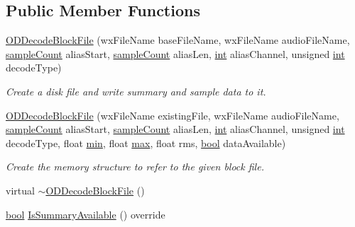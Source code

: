 \subsection*{Public Member Functions}
\begin{DoxyCompactItemize}
\item 
\hyperlink{class_o_d_decode_block_file_a4fceaa09f31eba3324c9d2920ae94917}{O\+D\+Decode\+Block\+File} (wx\+File\+Name base\+File\+Name, wx\+File\+Name audio\+File\+Name, \hyperlink{include_2audacity_2_types_8h_afa427e1f521ea5ec12d054e8bd4d0f71}{sample\+Count} alias\+Start, \hyperlink{include_2audacity_2_types_8h_afa427e1f521ea5ec12d054e8bd4d0f71}{sample\+Count} alias\+Len, \hyperlink{xmltok_8h_a5a0d4a5641ce434f1d23533f2b2e6653}{int} alias\+Channel, unsigned \hyperlink{xmltok_8h_a5a0d4a5641ce434f1d23533f2b2e6653}{int} decode\+Type)
\begin{DoxyCompactList}\small\item\em Create a disk file and write summary and sample data to it. \end{DoxyCompactList}\item 
\hyperlink{class_o_d_decode_block_file_a9004e38acde9c80cb2f01de0ca780e76}{O\+D\+Decode\+Block\+File} (wx\+File\+Name existing\+File, wx\+File\+Name audio\+File\+Name, \hyperlink{include_2audacity_2_types_8h_afa427e1f521ea5ec12d054e8bd4d0f71}{sample\+Count} alias\+Start, \hyperlink{include_2audacity_2_types_8h_afa427e1f521ea5ec12d054e8bd4d0f71}{sample\+Count} alias\+Len, \hyperlink{xmltok_8h_a5a0d4a5641ce434f1d23533f2b2e6653}{int} alias\+Channel, unsigned \hyperlink{xmltok_8h_a5a0d4a5641ce434f1d23533f2b2e6653}{int} decode\+Type, float \hyperlink{_compare_audio_command_8cpp_abd8bbcfabb3ddef2ccaafb9928a37b95}{min}, float \hyperlink{_t_d_stretch_8cpp_ac39d9cef6a5e030ba8d9e11121054268}{max}, float rms, \hyperlink{mac_2config_2i386_2lib-src_2libsoxr_2soxr-config_8h_abb452686968e48b67397da5f97445f5b}{bool} data\+Available)
\begin{DoxyCompactList}\small\item\em Create the memory structure to refer to the given block file. \end{DoxyCompactList}\item 
virtual \hyperlink{class_o_d_decode_block_file_a68cd9e46ddf89238b5802665b2a006e2}{$\sim$\+O\+D\+Decode\+Block\+File} ()
\item 
\hyperlink{mac_2config_2i386_2lib-src_2libsoxr_2soxr-config_8h_abb452686968e48b67397da5f97445f5b}{bool} \hyperlink{class_o_d_decode_block_file_a3b9eebb6117547ddfb2eafb06923b871}{Is\+Summary\+Available} () override

\end{DoxyCompactItemize}

